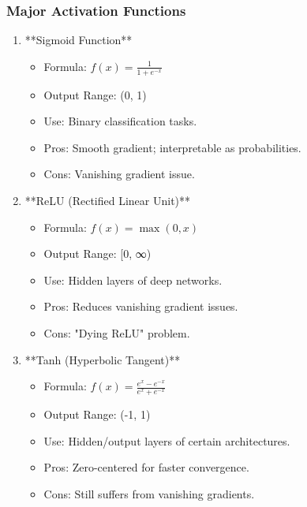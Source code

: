 \documentclass[aspectratio=169]{beamer}
\begin{document}
\begin{frame}[fragile]
    \frametitle{Major Activation Functions}
    \begin{enumerate}
        \item **Sigmoid Function** 
        \begin{itemize}
            \item Formula: \( f(x) = \frac{1}{1 + e^{-x}} \)
            \item Output Range: (0, 1)
            \item Use: Binary classification tasks.
            \item Pros: Smooth gradient; interpretable as probabilities.
            \item Cons: Vanishing gradient issue.
        \end{itemize}
        
        \item **ReLU (Rectified Linear Unit)** 
        \begin{itemize}
            \item Formula: \( f(x) = \max(0, x) \)
            \item Output Range: [0, ∞)
            \item Use: Hidden layers of deep networks.
            \item Pros: Reduces vanishing gradient issues.
            \item Cons: "Dying ReLU" problem.
        \end{itemize}
        
        \item **Tanh (Hyperbolic Tangent)** 
        \begin{itemize}
            \item Formula: \( f(x) = \frac{e^x - e^{-x}}{e^x + e^{-x}} \)
            \item Output Range: (-1, 1)
            \item Use: Hidden/output layers of certain architectures.
            \item Pros: Zero-centered for faster convergence.
            \item Cons: Still suffers from vanishing gradients.
        \end{itemize}
    \end{enumerate}
\end{frame}
\end{document}

